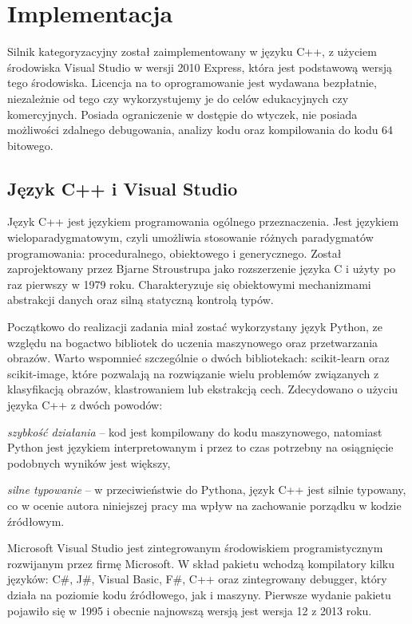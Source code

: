 \chapter{Implementacja}

Silnik kategoryzacyjny został zaimplementowany w języku C++, z użyciem środowiska Visual Studio w wersji 2010 Express, która jest podstawową wersją tego środowiska. Licencja na to oprogramowanie jest wydawana bezpłatnie, niezależnie od tego czy wykorzystujemy je do celów edukacyjnych czy komercyjnych. Posiada ograniczenie w dostępie do wtyczek, nie posiada możliwości zdalnego debugowania, analizy kodu oraz kompilowania do kodu 64 bitowego.

\section{Język C++ i Visual Studio}

Język C++ jest językiem programowania ogólnego przeznaczenia. Jest językiem wieloparadygmatowym, czyli umożliwia stosowanie różnych paradygmatów programowania: proceduralnego, obiektowego i generycznego. Został zaprojektowany przez Bjarne Stroustrupa jako rozszerzenie języka C i użyty po raz pierwszy w 1979 roku. Charakteryzuje się obiektowymi mechanizmami abstrakcji danych oraz silną statyczną kontrolą typów.\cite{GREBOSZ06}

Początkowo do realizacji zadania miał zostać wykorzystany język Python, ze względu na bogactwo bibliotek do uczenia maszynowego oraz przetwarzania obrazów. Warto wspomnieć szczególnie o dwóch bibliotekach: scikit-learn oraz scikit-image, które pozwalają na rozwiązanie wielu problemów związanych z klasyfikacją obrazów, klastrowaniem lub ekstrakcją cech. Zdecydowano o użyciu języka C++ z dwóch powodów:

\begin{compactitem}
	\item \emph{szybkość działania} -- kod jest kompilowany do kodu maszynowego, natomiast Python jest językiem interpretowanym i przez to czas potrzebny na osiągnięcie podobnych wyników jest większy,
	\item \emph{silne typowanie} -- w przeciwieństwie do Pythona, język C++ jest silnie typowany, co w ocenie autora niniejszej pracy ma wpływ na zachowanie porządku w kodzie źródłowym.
\end{compactitem}

Microsoft Visual Studio jest zintegrowanym środowiskiem programistycznym rozwijanym przez firmę Microsoft. W skład pakietu wchodzą kompilatory kilku języków: C\#, J\#, Visual Basic, F\#, C++ oraz zintegrowany debugger, który działa na poziomie kodu źródłowego, jak i maszyny. Pierwsze wydanie pakietu pojawiło się w 1995 i obecnie najnowszą wersją jest wersja 12 z 2013 roku.\cite{MSDN13}

